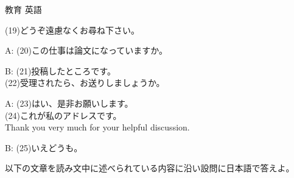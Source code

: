 \documentclass[fleqn]{jbook}
\begin{document}
\begin{question}{教育 英語}{}
\begin{subquestions}
\begin{list}{}{\itemindent=0mm \topsep=0mm \itemsep=-0.5mm }
             (19)どうぞ遠慮なくお尋ね下さい。
  \item[A:]  (20)この仕事は論文になっていますか。
  \item[B:]  (21)投稿したところです。\\
             (22)受理されたら、お送りしましょうか。
  \item[A:]  (23)はい、是非お願いします。\\
             (24)これが私のアドレスです。\\
             Thank you very much for your helpful discussion.
  \item[B:]  (25)いえどうも。
  \end{list}




\SubQuestion
  以下の文章を読み文中に述べられている内容に沿い設問に日本語で答えよ。
\baselineskip=12pt


\end{subquestions}
\end{question}
\end{document}
